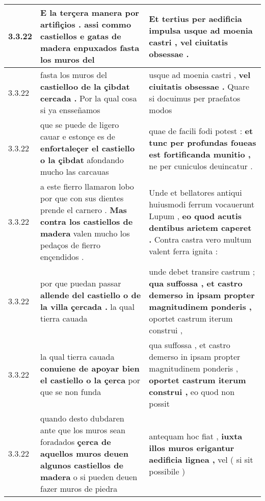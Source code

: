 \begin{tabular}{|p{1cm}|p{6.5cm}|p{6.5cm}|}
3.3.22 & E la terçera manera por artifiçios . \textbf{ assi commo castiellos e gatas de madera enpuxados } fasta los muros del & Et tertius per aedificia impulsa \textbf{ usque ad moenia castri , } vel ciuitatis obsessae . \\\hline
3.3.22 & fasta los muros del \textbf{ castielloo de la çibdat cercada . } Por la qual cosa si ya ensseñamos & usque ad moenia castri , \textbf{ vel ciuitatis obsessae . } Quare si docuimus per praefatos modos \\\hline
3.3.22 & que se puede de ligero cauar e estonçe es de \textbf{ enfortaleçer el castiello o la çibdat } afondando mucho las carcauas & quae de facili fodi potest : \textbf{ et tunc per profundas foueas est fortificanda munitio , } ne per cuniculos deuincatur . \\\hline
3.3.22 & a este fierro llamaron lobo por que con sus dientes prende el carnero . \textbf{ Mas contra los castiellos de madera } valen mucho los pedaços de fierro ençendidos . & Unde et bellatores antiqui huiusmodi ferrum vocauerunt Lupum , \textbf{ eo quod acutis dentibus arietem caperet . } Contra castra vero multum valent ferra ignita : \\\hline
3.3.22 & por que puedan passar \textbf{ allende del castiello o de la villa çercada . } la qual tierra cauada & unde debet transire castrum ; \textbf{ qua suffossa , et castro demerso in ipsam propter magnitudinem ponderis , } oportet castrum iterum construi , \\\hline
3.3.22 & la qual tierra cauada \textbf{ conuiene de apoyar bien el castiello o la çerca } por que se non funda & qua suffossa , et castro demerso in ipsam propter magnitudinem ponderis , \textbf{ oportet castrum iterum construi , } eo quod non possit \\\hline
3.3.22 & quando desto dubdaren ante que los muros sean foradados \textbf{ çerca de aquellos muros deuen algunos castiellos de madera } o si pueden deuen fazer muros de piedra & antequam hoc fiat , \textbf{ iuxta illos muros erigantur aedificia lignea , } vel ( si sit possibile ) \\\hline

\end{tabular}
